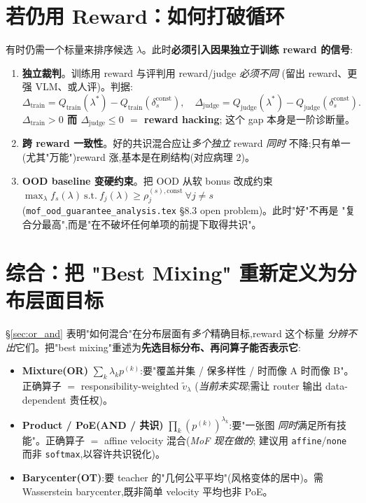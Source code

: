 \documentclass[11pt,a4paper]{article}
\newcommand{\const}{\mathrm{const}}
\theoremstyle{definition}
\begin{document}
\section{若仍用 Reward：如何打破循环}
\label{sec:break_loop}

有时仍需一个标量来排序候选 $\lambda$。此时\textbf{必须引入因果独立于训练 reward
的信号}:

\begin{enumerate}[leftmargin=1.5em]
\item \textbf{独立裁判}。训练用 reward 与评判用 reward/judge \emph{必须不同}
(留出 reward、更强 VLM、或人评)。判据:
\begin{equation}
\Delta_{\text{train}}=Q_{\text{train}}(\lambda^*)-Q_{\text{train}}(\delta_s^\const),\quad
\Delta_{\text{judge}}=Q_{\text{judge}}(\lambda^*)-Q_{\text{judge}}(\delta_s^\const).
\end{equation}
\textbf{$\Delta_{\text{train}}>0$ 而 $\Delta_{\text{judge}}\le 0$ $=$ reward hacking};
这个 gap 本身是一阶诊断量。
\item \textbf{跨 reward 一致性}。好的共识混合应让\emph{多个独立} reward \emph{同时}
不降;只有单一(尤其"万能")reward 涨,基本是在刷结构(对应病理 2)。
\item \textbf{OOD baseline 变硬约束}。把 OOD 从软 bonus 改成约束
$\max_\lambda f_s(\lambda)\ \text{s.t.}\ f_j(\lambda)\ge \rho_j^{(s),\const}\ \forall j\neq s$
(\texttt{mof\_ood\_guarantee\_analysis.tex} \S8.3 open problem)。此时"好"不再是
"复合分最高",而是"在不破坏任何单项的前提下取得共识"。
\end{enumerate}

\section{综合：把 "Best Mixing" 重新定义为分布层面目标}
\label{sec:synthesis}

\S\ref{sec:or_and} 表明"如何混合"在分布层面有\emph{多个}精确目标,reward 这个标量
\emph{分辨不出}它们。把"best mixing"重述为\textbf{先选目标分布、再问算子能否表示它}:

\begin{itemize}[leftmargin=1.5em]
\item \textbf{Mixture(OR)} $\sum_k\lambda_k p^{(k)}$:要"覆盖并集 / 保多样性 / 时而像
A 时而像 B"。正确算子 $=$ responsibility-weighted $\tilde v_\lambda$
(\emph{当前未实现};需让 router 输出 data-dependent 责任权)。
\item \textbf{Product / PoE(AND / 共识)} $\prod_k (p^{(k)})^{\lambda_k}$:要"一张图
\emph{同时}满足所有技能"。正确算子 $=$ affine velocity 混合(\emph{MoF 现在做的};
建议用 \texttt{affine}/\texttt{none} 而非 \texttt{softmax},以容许共识锐化)。
\item \textbf{Barycenter(OT)}:要 teacher 的"几何公平平均"(风格变体的居中)。需
Wasserstein barycenter,既非简单 velocity 平均也非 PoE。
\end{itemize}
\end{document}
